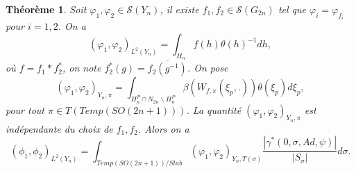 \documentclass{amsart}
\newtheorem{theoreme}{Théorème}[section]
\begin{document}
\begin{theoreme}
\label{thPlanch}
Soit $\varphi_1, \varphi_2 \in \mathcal{S}(Y_n)$, il existe $f_1, f_2 \in \mathcal{S}(G_{2n})$ tel que $\varphi_i = \varphi_{f_i}$ pour $i = 1,2$. On a
\begin{equation}
\label{psf}
(\varphi_1, \varphi_2)_{L^2(Y_n)} = \int_{H_n} f(h) \theta(h)^{-1} dh,
\end{equation}
où $f = f_1 * f_2^{*}$, on note $f_2^*(g) = \overline{f_2(g^{-1})}$. On pose
\begin{equation}
(\varphi_1, \varphi_2)_{Y_n, \pi} = \int_{H^P_n \cap N_{2n} \backslash H^P_n} \beta\left(W_{f,\pi}(\xi_p,.)\right) \theta(\xi_p) d\xi_p,
\end{equation}
pour tout $\pi \in T(Temp(SO(2n+1)))$. La quantité $(\varphi_1, \varphi_2)_{Y_n, \pi}$ est indépendante du choix de $f_1,f_2$. Alors on a
\begin{equation}
(\phi_1, \phi_2)_{L^2(Y_n)} = \int_{Temp(SO(2n+1))/Stab} (\varphi_1, \varphi_2)_{Y_n, T(\sigma)} \frac{|\gamma^*(0, \sigma, Ad, \psi)|}{|S_\sigma|}d\sigma.
\end{equation}
\end{theoreme}
\end{document}
